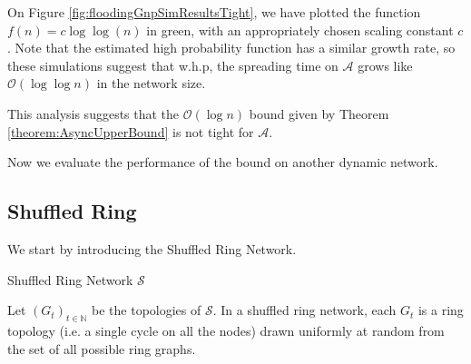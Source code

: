 On Figure \ref{fig:floodingGnpSimResultsTight}, we have plotted the function $f(n) = c \log \log (n)$ in green, with an appropriately chosen scaling constant $c$. Note that the estimated high probability function has a similar growth rate, so these simulations suggest that w.h.p, the spreading time on $\mathcal{A}$ grows like $\mathcal{O}(\log \log n)$ in the network size.

This analysis suggests that the $\mathcal{O}(\log n)$ bound given by Theorem \ref{theorem:AsyncUpperBound} is not tight for $\mathcal{A}$.

Now we evaluate the performance of the bound on another dynamic network.

\subsection{Shuffled Ring}\label{section:shuffledRingAsyncApplication}

We start by introducing the Shuffled Ring Network.

\begin{definition}
	Shuffled Ring Network $\mathcal{S}$

	Let $(G_t)_{t \in \mathbb{N}}$ be the topologies of $\mathcal{S}$. In a shuffled ring network, each $G_t$ is a ring topology (i.e. a single cycle on all the nodes) drawn uniformly at random from the set of all possible ring graphs. 
\end{definition}

